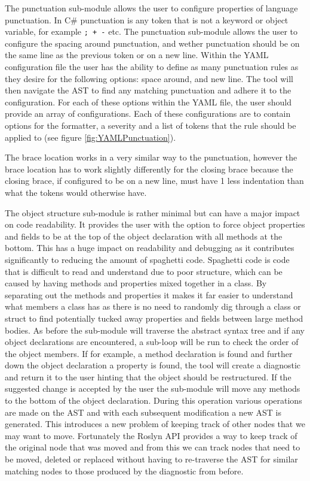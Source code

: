 The punctuation sub-module allows the user to configure properties of language punctuation. In C\# punctuation is any token that is not a keyword or object variable, for example \texttt{; + -} etc. The punctuation sub-module allows the user to configure the spacing around punctuation, and wether punctuation should be on the same line as the previous token or on a new line. Within the YAML configuration file the user has the ability to define as many punctuation rules as they desire for the following options: space around, and new line. The tool will then navigate the AST to find any matching punctuation and adhere it to the configuration. For each of these options within the YAML file, the user should provide an array of configurations. Each of these configurations are to contain options for the formatter, a severity and a list of tokens that the rule should be applied to (see figure \ref{fig:YAMLPunctuation}).

The brace location works in a very similar way to the punctuation, however the brace location has to work slightly differently for the closing brace because the closing brace, if configured to be on a new line, must have 1 less indentation than what the tokens would otherwise have.

The object structure sub-module is rather minimal but can have a major impact on code readability. It provides the user with the option to force object properties and fields to be at the top of the object declaration with all methods at the bottom. This has a huge impact on readability and debugging as it contributes significantly to reducing the amount of spaghetti code. Spaghetti code is code that is difficult to read and understand due to poor structure, which can be caused by having methods and properties mixed together in a class. By separating out the methods and properties it makes it far easier to understand what members a class has as there is no need to randomly dig through a class or struct to find potentially tucked away properties and fields between large method bodies.
As before the sub-module will traverse the abstract syntax tree and if any object declarations are encountered, a sub-loop will be run to check the order of the object members. If for example, a method declaration is found and further down the object declaration a property is found, the tool will create a diagnostic and return it to the user hinting that the object should be restructured. If the suggested change is accepted by the user the sub-module will move any methods to the bottom of the object declaration. During this operation various operations are made on the AST and with each subsequent modification a new AST is generated. This introduces a new problem of keeping track of other nodes that we may want to move. Fortunately the Roslyn API provides a way to keep track of the original node that was moved and from this we can track nodes that need to be moved, deleted or replaced without having to re-traverse the AST for similar matching nodes to those produced by the diagnostic from before.
